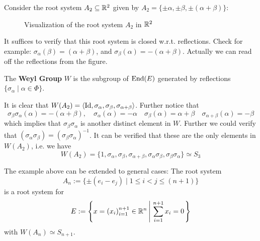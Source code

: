 \documentclass{article}
\begin{document}
\begin{example}
    Consider the root system $A_2 \subseteq \mathbb{R}^2$ given by $A_2 = \{ \pm \alpha, \pm \beta, \pm (\alpha + \beta) \}$:

    \begin{figure}[H]
        \centering
        \caption{Visualization of the root system $A_2$ in $\mathbb{R}^2$}
    \end{figure}
    It suffices to verify that this root system is closed w.r.t. reflections. Check for example: $\sigma_{\alpha}(\beta) = (\alpha + \beta)$, and $\sigma_{\beta}(\alpha) = -(\alpha + \beta)$. Actually we can read off the reflections from the figure.
\end{example}

\begin{definition}
    The \textbf{Weyl Group} $W$ is the subgroup of $\mathrm{End}(E)$ generated by reflections $\{ \sigma_{\alpha} \mid \alpha \in \Phi \}$.
\end{definition}
\nogap
\begin{example}
    It is clear that $W(A_2) = \left\langle \mathrm{Id}, \sigma_{\alpha}, \sigma_{\beta}, \sigma_{\alpha+\beta} \right\rangle$. Further notice that
    \[
        \sigma_{\beta} \sigma_{\alpha} (\alpha) = -(\alpha + \beta), \quad 
        \sigma_{\alpha}(\alpha) = -\alpha \quad
        \sigma_{\beta}(\alpha) = \alpha + \beta \quad
        \sigma_{\alpha + \beta}(\alpha) = -\beta
    \]
    which implies that $\sigma_{\beta} \sigma_{\alpha}$ is another distinct element in $W$. Further we could verify that $(\sigma_{\alpha} \sigma_{\beta}) = (\sigma_{\beta} \sigma_{\alpha})^{-1}$. It can be verified that these are the only elements in $W(A_2)$, i.e. we have
    \[
        W(A_2) = \{ 1, \sigma_{\alpha}, \sigma_{\beta}, \sigma_{\alpha + \beta}, \sigma_{\alpha}\sigma_{\beta}, \sigma_{\beta} \sigma_{\alpha} \} \simeq S_3
    \]
\end{example}
\nogap
\begin{remark}
    The example above can be extended to general cases: The root system
    \[
        A_n := \{ \pm (e_i - e_j) \mid 1 \leq i < j \leq (n+1) \}
    \]
    is a root system for 
    \[
        E := \left\{ x = \left( x_i \right)_{i = 1}^{n+1} \in \mathbb{R}^n \left|\ \sum_{i = 1}^{n+1} x_i = 0 \right. \right\}
    \]
    with $W(A_n) \simeq S_{n+1}$.
\end{remark}
\end{document}
